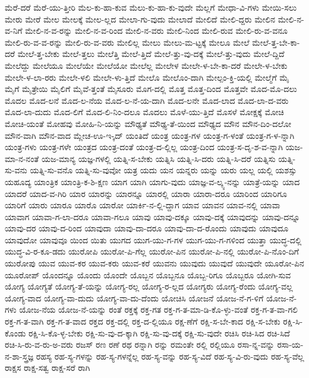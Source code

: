 {ಮೆರೆ-ದರೆ
ಮೆರೆ-ಯು-ತ್ತೀರಿ
ಮೆಲ-ಕು-ಹಾ-ಕುವ
ಮೆಲು-ಕು-ಹಾ-ಕು-ವುದೇ
ಮೆಲ್ಲಗೆ
ಮೇಧಾ-ವಿ-ಗಳು
ಮೇಯಿ-ಸಲು
ಮೇರು
ಮೇರೆ
ಮೇಲ
ಮೇಲಕ್ಕೆ
ಮೇಲ-ಲ್ಲದ
ಮೇಲಾ-ಗು-ವುದು
ಮೇಲಾದೆ
ಮೇಲಿದೆ
ಮೇಲಿ-ದ್ದರು
ಮೇಲಿನ
ಮೇಲಿ-ನ-ವ-ನಿಗೆ
ಮೇಲಿ-ನ-ವ-ರನ್ನು
ಮೇಲಿ-ನ-ವ-ರಿಂದ
ಮೇಲಿ-ನ-ವರು
ಮೇಲಿ-ನಿಂದ
ಮೇಲಿ-ರುವ
ಮೇಲಿ-ರು-ವ-ವನೂ
ಮೇಲಿ-ರು-ವ-ವ-ರನ್ನು
ಮೇಲಿ-ರು-ವ-ವರು
ಮೇಲಿಲ್ಲ
ಮೇಲು
ಮೇಲು-ಮ-ಟ್ಟಕ್ಕೆ
ಮೇಲೂ
ಮೇಲೆ
ಮೇಲೆ-ತ್ತ-ಬೇ-ಕಾ-ದರೆ
ಮೇಲೆ-ತ್ತ-ಬೇಕು
ಮೇಲೆ-ತ್ತಲು
ಮೇಲೆತ್ತಿ
ಮೇಲೆ-ತ್ತಿದೆ
ಮೇಲೆ-ತ್ತು-ವು-ದಕ್ಕೆ
ಮೇಲೆ-ತ್ತು-ವುದು
ಮೇಲೆ-ದ್ದಿದೆ
ಮೇಲೆದ್ದು
ಮೇಲೆಯೂ
ಮೇಲೆಯೇ
ಮೇಲೆಯೋ
ಮೇಲೆಲ್ಲ
ಮೇಲೇಳ
ಮೇಲೇ-ಳ-ಬೇ-ಕಾ-ದರೆ
ಮೇಲೇ-ಳ-ಬೇಕು
ಮೇಲೇ-ಳ-ಲಾ-ರರು
ಮೇಲೇ-ಳಲಿ
ಮೇಲೇ-ಳು-ತ್ತಿದೆ
ಮೇಲೊ
ಮೇಲೊಂ-ದಾಗಿ
ಮೇಲ್ಪಂ-ಕ್ತಿ-ಯಲ್ಲಿ
ಮೇಲ್ಮೆಗೆ
ಮೈ
ಮೈಗೆ
ಮೈತ್ರೇಯಿ
ಮೈಲಿಗೆ
ಮೈವೆ-ತ್ತಂತೆ
ಮೈಸೂರು
ಮೊಗ-ದಲ್ಲಿ
ಮೊತ್ತ
ಮೊತ್ತ-ದಿಂದ
ಮೊತ್ತವೇ
ಮೊದ-ಮೊ-ದಲು
ಮೊದಲ
ಮೊದ-ಲನೆ
ಮೊದ-ಲ-ನೆಯ
ಮೊದ-ಲ-ನೆ-ಯ-ದಾಗಿ
ಮೊದ-ಲನೇ
ಮೊದ-ಲಾದ
ಮೊದ-ಲಾ-ದ-ವರು
ಮೊದ-ಲಾ-ದುದು
ಮೊದ-ಲಿಗೆ
ಮೊದ-ಲಿ-ನಿಂ-ದಲೂ
ಮೊದಲು
ಮೊಳೆ-ಯು-ತ್ತಿದೆ
ಮೊಸಳೆ
ಮೋಕ್ಷಕ್ಕೆ
ಮೋಚಿ
ಮೋಚಿ-ಯಂತೆ
ಮೋಹವು
ಮೋಹಿ-ನಿ-ಯನ್ನು
ಮೌಢ್ಯತೆ
ಮೌಢ್ಯ-ತೆ-ಯಿಂದ
ಮೌಢ್ಯದ
ಮೌನ
ಮೌನ-ದಿಂ-ದಲೋ
ಮೌನ-ವಾಗಿ
ಮೌನ-ವಾದ
ಮ್ಲೇಚ-ಊ-ಇ-್ಕದ್
ಯಂತಿದೆ
ಯಂತ್ರ
ಯಂತ್ರ-ಗಳ
ಯಂತ್ರ-ಗ-ಳಂತೆ
ಯಂತ್ರ-ಗ-ಳ-ನ್ನಾಗಿ
ಯಂತ್ರ-ಗಳು
ಯಂತ್ರ-ಗಳೇ
ಯಂತ್ರದ
ಯಂತ್ರ-ದಂತೆ
ಯಂತ್ರ-ದ-ಲ್ಲಿಲ್ಲ
ಯಂತ್ರ-ದಿಂದ
ಯಂತ್ರ-ಸ-ದೃ-ಶ-ವ-ನ್ನಾಗಿ
ಯಜ-ಮಾ-ನ-ನಂತೆ
ಯಜ-ಮಾನ್ಯ
ಯಜ್ಞ-ಗಳಲ್ಲಿ
ಯತ್ನಿ-ಸ-ಬೇಕು
ಯತ್ನಿಸಿ
ಯತ್ನಿ-ಸಿ-ದರು
ಯತ್ನಿ-ಸಿ-ದರೆ
ಯತ್ನಿಸು
ಯತ್ನಿ-ಸು-ವನು
ಯತ್ನಿ-ಸು-ವನೊ
ಯತ್ನಿ-ಸು-ವುವೋ
ಯತ್ರ
ಯದು
ಯನ
ಯನ್ನರು
ಯನ್ನು
ಯರು
ಯಲ್ಲ
ಯಲ್ಲಿ
ಯಶಸ್ಸು
ಯಹೂದ್ಯ
ಯಾಂತ್ರಿಕ
ಯಾಂತ್ರಿ-ಕ-ಶಿ-ಕ್ಷಣ
ಯಾಗ
ಯಾಗಿ
ಯಾಗು-ವುದು
ಯಾಜ್ಞ-ವ-ಲ್ಕ್ಯ-ನನ್ನು
ಯಾತ್ರೆ-ಯನ್ನು
ಯಾದ
ಯಾದರೆ
ಯಾದ-ವ-ಗಿರಿ
ಯಾರ
ಯಾರನ್ನು
ಯಾರನ್ನೂ
ಯಾರಲ್ಲಿ
ಯಾರಾ
ಯಾರಾ-ದರೂ
ಯಾರಿಂದ
ಯಾರಿಗೂ
ಯಾರಿಗೆ
ಯಾರು
ಯಾರೂ
ಯಾರೊ
ಯಾರೋ
ಯಾರ್ಕಿ-ನ-ಲ್ಲಿ-ದ್ದಾಗ
ಯಾವ
ಯಾವನ
ಯಾವ-ನಲ್ಲಿ
ಯಾವಾ
ಯಾವಾಗ
ಯಾವಾ-ಗ-ಲಾ-ದರೂ
ಯಾವಾ-ಗಲೂ
ಯಾವು
ಯಾವು-ದಕ್ಕೂ
ಯಾವು-ದಕ್ಕೆ
ಯಾವುದನ್ನು
ಯಾವು-ದನ್ನೂ
ಯಾವು-ದರ
ಯಾವು-ದ-ರಿಂದ
ಯಾವುದಾ
ಯಾವು-ದಾ-ದರೂ
ಯಾವು-ದಾ-ದ-ರೊಂದು
ಯಾವುದು
ಯಾವುದೂ
ಯಾವುದೋ
ಯಾವುವೂ
ಯಿಂದ
ಯಿತು
ಯುಗದ
ಯುಗ-ಯು-ಗ-ಗಳ
ಯುಗ-ಯು-ಗ-ಗಳಿಂದ
ಯುತ್ತಾ
ಯುದ್ಧ-ದಲ್ಲಿ
ಯುದ್ಧ-ವಿ-ರ-ಕೂ-ಡದು
ಯುರೋಪಿ
ಯುರೋ-ಪಿ-ಗೆಲ್ಲ
ಯುರೋ-ಪಿನ
ಯುರೋ-ಪಿ-ನಲ್ಲಿ
ಯುರೋ-ಪಿ-ನೊಂ-ದಿಗೆ
ಯುರೋಪು
ಯುವ
ಯುವ-ಕರ
ಯುವ-ಕರು
ಯುವ-ಕರೆ
ಯುವನು
ಯುವುದು
ಯುವುದೆ
ಯುವುದೇ
ಯೂರೋ-ಪಿನ
ಯೂರೋಪ್
ಯೊಂದನ್ನೂ
ಯೊಂದು
ಯೊಂದೇ
ಯೊಬ್ಬನ
ಯೊಬ್ಬನೂ
ಯೊಬ್ಬ-ರಿಗೂ
ಯೊಬ್ಬರೂ
ಯೋಗಿ-ಸುವ
ಯೋಗ್ಯ
ಯೋಗ್ಯತೆ
ಯೋಗ್ಯ-ತೆ-ಯನ್ನು
ಯೋಗ್ಯ-ರಲ್ಲ
ಯೋಗ್ಯ-ರ-ಲ್ಲದ
ಯೋಗ್ಯರು
ಯೋಗ್ಯ-ರೆಂದು
ಯೋಗ್ಯ-ವಲ್ಲ
ಯೋಗ್ಯ-ವಾದ
ಯೋಗ್ಯ-ವಾ-ದುದು
ಯೋಗ್ಯ-ವಾ-ದು-ದೆಂದು
ಯೋಚಿಸಿ
ಯೋಜನೆ
ಯೋಜ-ನೆ-ಗ-ಳಿಗೆ
ಯೋಜ-ನೆ-ಗಳು
ಯೋಜ-ನೆಯ
ಯೋಜ-ನೆ-ಯನ್ನು
ರಂತೆ
ರಕ್ತಕ್ಕೆ
ರಕ್ತ-ಗತ
ರಕ್ತ-ಗ-ತ-ಮಾ-ಡಿ-ಕೊ-ಳ್ಳು-ವಂತೆ
ರಕ್ತ-ಗ-ತ-ವಾ-ಗಲಿ
ರಕ್ತ-ಗ-ತ-ವಾಗಿ
ರಕ್ತ-ಗ-ತ-ವಾದ
ರಕ್ತದ
ರಕ್ತ-ದಲ್ಲಿ
ರಕ್ತ-ದ-ಲ್ಲಿಯೂ
ರಕ್ಷ-ಣೆಗೆ
ರಕ್ಷಿ-ಸ-ಬೇ-ಕಾದ
ರಕ್ಷಿ-ಸ-ಬೇಕು
ರಕ್ಷಿ-ಸಿ-ಕೊಂಡು
ರಕ್ಷಿ-ಸಿ-ಕೊ-ಳ್ಳ-ಬೇಕು
ರಕ್ಷಿ-ಸು-ವು-ದ-ಕ್ಕಾಗಿ
ರಕ್ಷಿ-ಸು-ವು-ದಕ್ಕೆ
ರಕ್ಷಿ-ಸು-ವುದೇ
ರಚಿಸಿ
ರಚಿ-ಸಿದ
ರಚಿ-ಸಿದೆ
ರಚಿ-ಸಿ-ರು-ವ-ರು-ಅ-ವರು
ರಜಸ್
ರಣ
ರಣೆ
ರಥ
ರನ್ನಾಗಿ
ರನ್ನು
ರಮಂತೇ
ರಲ್ಲಿ
ರಲ್ಲಿಯೂ
ರಸಾ-ನ್ನ-ವನ್ನು
ರಸಾ-ಯ-ನ-ಶಾ-ಸ್ತ್ರಜ್ಞ
ರಹಸ್ಯ
ರಹ-ಸ್ಯ-ಗಳನ್ನು
ರಹ-ಸ್ಯ-ಗಳನ್ನೆಲ್ಲ
ರಹ-ಸ್ಯ-ವನ್ನು
ರಹ-ಸ್ಯ-ವಿದೆ
ರಹ-ಸ್ಯ-ವಿ-ರು-ವುದು
ರಹ-ಸ್ಯ-ವೆಲ್ಲ
ರಾಕ್ಷಸ
ರಾಕ್ಷ-ಸತ್ವ
ರಾಕ್ಷ-ಸರೆ
ರಾಗಿ
}
